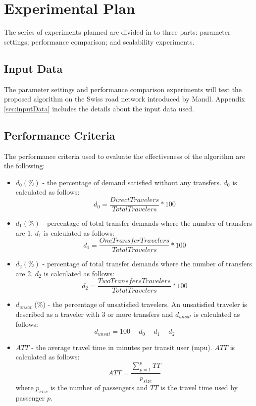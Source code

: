 \section{Experimental Plan}
\label{sec:expPlan}
The series of experiments planned are divided in to three parts: parameter settings; performance comparison; and scalability experiments.

\subsection{Input Data}
The parameter settings and performance comparison experiments will test the proposed algorithm on the Swiss road network introduced by Mandl\citep{mandl79}. Appendix \vref{sec:inputData} includes the details about the input data used.%

\subsection{Performance Criteria}
\label{sec:performanceCriteria}
The performance criteria used to evaluate the effectiveness of the algorithm are the following:
\begin{itemize}
\item $d_0 (\%)$ - the percentage of demand satisfied without any transfers. $d_0$ is calculated as follows:
$$ d_0 = \frac{DirectTravelers}{TotalTravelers}*100$$
\item $d_1 (\%)$ - percentage of total transfer demands where the number of transfers are 1. $d_1$ is calculated as follows:
$$ d_1 = \frac{OneTransferTravelers}{TotalTravelers}*100$$
\item $d_2 (\%)$ - percentage of total transfer demands where the number of transfers are 2. $d_2$ is calculated as follows:
$$ d_2 = \frac{TwoTransfersTravelers}{TotalTravelers}*100$$
\item $d_{unsat}$ (\%) - the percentage of unsatisfied travelers. An unsatisfied traveler is described as a traveler with 3 or more transfers and $d_{unsat}$ is calculated as follows:
$$ d_{unsat} = 100 - d_0 - d_1 - d_2$$
\item $ATT$  - the average travel time in minutes per transit user (mpu). $ATT$ is calculated as follows:
$$ATT = \frac{\sum\limits^{p}_{p=1}TT}{p_{size}}$$
where $p_{size}$ is the number of passengers and $TT$ is the travel time used by passenger $p$. 
\end{itemize}


